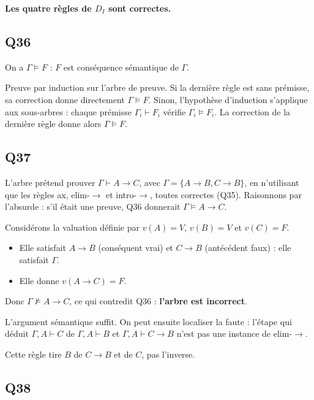 \documentclass[11pt,a4paper]{article}
\providecommand{\tightlist}{\setlength{\itemsep}{0pt}\setlength{\parskip}{0pt}}
\begin{document}
\textbf{Les quatre règles de \(D_I\) sont correctes.}

\hypertarget{q36}{%
\subsection{Q36}\label{q36}}

On a \(\boxed{\Gamma \models F}\) : \(F\) est conséquence sémantique de \(\Gamma\).

Preuve par induction sur l'arbre de preuve. Si la dernière règle est sans prémisse, sa correction donne directement \(\Gamma \models F\). Sinon, l'hypothèse d'induction s'applique aux sous-arbres : chaque prémisse \(\Gamma_i \vdash F_i\) vérifie \(\Gamma_i \models F_i\). La correction de la dernière règle donne alors \(\Gamma \models F\).

\hypertarget{q37}{%
\subsection{Q37}\label{q37}}

L'arbre prétend prouver \(\Gamma \vdash A \to C\), avec \(\Gamma = \{A \to B, C \to B\}\), en n'utilisant que les règles ax, elim-\(\to\) et intro-\(\to\), toutes correctes (Q35). Raisonnons par l'absurde : s'il était une preuve, Q36 donnerait \(\Gamma \models A \to C\).

Considérons la valuation définie par \(v(A) = V\), \(v(B) = V\) et \(v(C) = F\).

\begin{itemize}
\tightlist
\item
  Elle satisfait \(A \to B\) (conséquent vrai) et \(C \to B\) (antécédent faux) : elle satisfait \(\Gamma\).
\item
  Elle donne \(v(A \to C) = F\).
\end{itemize}

Donc \(\Gamma \not\models A \to C\), ce qui contredit Q36 : \textbf{l'arbre est incorrect}.

L'argument sémantique suffit. On peut ensuite localiser la faute : l'étape qui déduit \(\Gamma, A \vdash C\) de \(\Gamma, A \vdash B\) et \(\Gamma, A \vdash C \to B\) n'est pas une instance de elim-\(\to\).

Cette règle tire \(B\) de \(C \to B\) et de \(C\), pas l'inverse.

\hypertarget{q38}{%
\subsection{Q38}\label{q38}}
\end{document}
